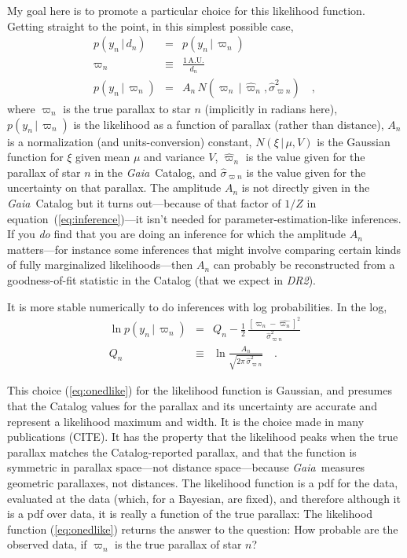 \documentclass[12pt, modern]{aastex62}
\newcommand{\acronym}[1]{{\small{#1}}}
\newcommand{\Gaia}{\textsl{Gaia}}
\newcommand{\DRtwo}{\textsl{\acronym{DR2}}}
\newcommand{\equationname}{equation}
\newcommand{\AU}{\mathrm{A.U.}}
\newcommand{\given}{\,|\,}
\begin{document}
My goal here is to promote a particular choice for this likelihood function.
Getting straight to the point, in this simplest possible case, 
\begin{eqnarray}
p(y_n\given d_n) &=& p(y_n\given\varpi_n)
\label{eq:gotoparallax}
\\
\varpi_n &\equiv& \frac{1\,\AU}{d_n}
\\
p(y_n\given\varpi_n) &=& A_n\,N(\varpi_n\given\hat{\varpi}_n,\hat{\sigma}^2_{\varpi n})
\label{eq:onedlike}
\quad ,
\end{eqnarray}
where
$\varpi_n$ is the true parallax to star $n$ (implicitly in radians here),
$p(y_n\given\varpi_n)$ is the likelihood as a function of parallax (rather than distance),
$A_n$ is a normalization (and units-conversion) constant,
$N(\xi\given\mu,V)$ is the Gaussian function for $\xi$ given mean $\mu$ and variance $V$,
$\hat{\varpi}_n$ is the value given for the parallax of star $n$ in the \Gaia\ Catalog,
and $\hat{\sigma}_{\varpi n}$ is the value given for the uncertainty on that parallax.
The amplitude $A_n$ is not directly given in the \Gaia\ Catalog
but it turns out---because of that factor of $1/Z$ in
\equationname~(\ref{eq:inference})---it isn't needed for parameter-estimation-like
inferences.
If you \emph{do} find that you are doing an inference for which the amplitude
$A_n$ matters---for instance some inferences that might involve comparing certain
kinds of fully marginalized likelihoods---then $A_n$ can probably be reconstructed
from a goodness-of-fit statistic in the Catalog (that we expect in \DRtwo).

It is more stable numerically to do inferences with log probabilities.
In the log,
\begin{eqnarray}
\ln p(y_n\given\varpi_n) &=& Q_n - \frac{1}{2}\,\frac{[\varpi_n - \hat{\varpi_n}]^2}{\hat{\sigma}^2_{\varpi n}}
\\
Q_n &\equiv& \ln\frac{A_n}{\sqrt{2\pi\,\hat{\sigma}^2_{\varpi n}}}
\quad .
\end{eqnarray}

This choice (\ref{eq:onedlike}) for the likelihood function is Gaussian,
and presumes that the
Catalog values for the parallax and its uncertainty are accurate and represent
a likelihood maximum and width.
It is the choice made in many publications (CITE).
It has the property that the likelihood peaks when the true parallax
matches the Catalog-reported parallax,
and that the function is symmetric in parallax space---not distance space---because
\Gaia\ measures geometric parallaxes, not distances.
The likelihood function is a pdf for the data, evaluated at the data (which,
for a Bayesian, are fixed), and therefore although it is a pdf over data,
it is really a function of the true parallax:
The likelihood function (\ref{eq:onedlike}) returns the answer to the question:
How probable are the observed data, if $\varpi_n$ is the true parallax of
star $n$?
\end{document}
